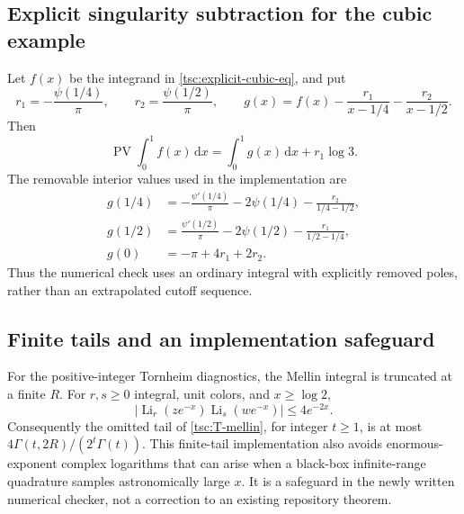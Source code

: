 \documentclass[11pt]{article}
\numberwithin{equation}{section}
\theoremstyle{definition}\newtheorem{definition}[theorem]{Definition}
\theoremstyle{remark}\newtheorem{remark}[theorem]{Remark}
\DeclareMathOperator{\Li}{Li}
\DeclareMathOperator{\PV}{PV}
\newcommand{\dd}{\,\mathrm d}
\begin{document}
\subsection{Explicit singularity subtraction for the cubic example}
Let $f(x)$ be the integrand in \eqref{tsc:explicit-cubic-eq}, and put
\[
 r_1=-\frac{\psi(1/4)}\pi,\qquad r_2=\frac{\psi(1/2)}\pi,
 \qquad g(x)=f(x)-\frac{r_1}{x-1/4}-\frac{r_2}{x-1/2}.
\]
Then
\begin{equation}\label{tsc:cubic-numeric}
 \PV\int_0^1 f(x)\dd x=\int_0^1g(x)\dd x+r_1\log3.
\end{equation}
The removable interior values used in the implementation are
\begin{align*}
 g(1/4)&=-\frac{\psi'(1/4)}\pi-2\psi(1/4)
                         -\frac{r_2}{1/4-1/2},\\
 g(1/2)&=\frac{\psi'(1/2)}\pi-2\psi(1/2)
                         -\frac{r_1}{1/2-1/4},\\
 g(0)&=-\pi+4r_1+2r_2.
\end{align*}
Thus the numerical check uses an ordinary integral with explicitly removed
poles, rather than an extrapolated cutoff sequence.

\subsection{Finite tails and an implementation safeguard}
For the positive-integer Tornheim diagnostics, the Mellin integral is
truncated at a finite $R$. For $r,s\ge0$ integral, unit colors, and
$x\ge\log2$,
\[
 |\Li_r(ze^{-x})\Li_s(we^{-x})|\le4e^{-2x}.
\]
Consequently the omitted tail of \eqref{tsc:T-mellin}, for integer $t\ge1$,
is at most $4\Gamma(t,2R)/(2^t\Gamma(t))$. This finite-tail implementation
also avoids enormous-exponent complex logarithms that can arise when a
black-box infinite-range quadrature samples astronomically large $x$.
It is a safeguard in the newly written numerical checker, not a correction
to an existing repository theorem.
\end{document}

